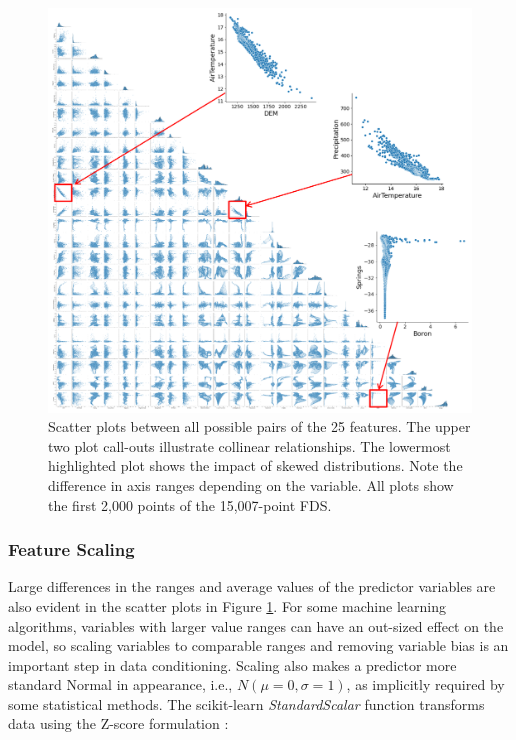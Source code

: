 \begin{figure}[!htp]
\centering
\includegraphics[width=\textwidth]{templates/images/Figure-Scatterplot_Unscaled_Features.png}
\caption[Unscaled FDS scatter plots]{Scatter plots between all possible pairs of the 25 features. The upper two plot call-outs illustrate collinear relationships. The lowermost highlighted plot shows the impact of skewed distributions. Note the difference in axis ranges depending on the variable. All plots show the first 2,000 points of the 15,007-point FDS.}
\label{fig:unscaled_scatter}
\end{figure}

\subsubsection{Feature Scaling}\label{ch3:scaling}
Large differences in the ranges and average values of the predictor variables are also evident in the scatter plots in Figure \ref{fig:unscaled_scatter}. For some machine learning algorithms, variables with larger value ranges can have an out-sized effect on the model, so scaling variables to comparable ranges and removing variable bias is an important step in data conditioning. Scaling also makes a predictor more standard Normal in appearance, i.e., $N(\mu=0, \sigma=1)$, as implicitly required by some statistical methods. The scikit-learn \textit{StandardScalar} function transforms data using the Z-score formulation \citep{scikit-learn_sklearnpreprocessingstandardscaler_2021}:

